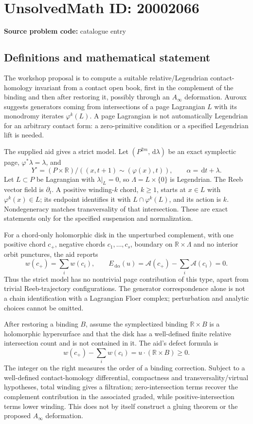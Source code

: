 \documentclass[11pt]{article}
\newcommand{\R}{\mathbb{R}}
\newcommand{\dd}{\,\mathrm{d}}
\begin{document}
\section*{UnsolvedMath ID: 20002066}
\textbf{Source problem code:} catalogue entry
\subsection{Definitions and mathematical statement}
The workshop proposal is to compute a suitable relative/Legendrian contact-homology invariant from a contact open book, first in the complement of the binding and then after restoring it, possibly through an \(A_\infty\) deformation. Auroux suggests generators coming from intersections of a page Lagrangian \(L\) with its monodromy iterates \(\varphi^k(L)\). A page Lagrangian is not automatically Legendrian for an arbitrary contact form: a zero-primitive condition or a specified Legendrian lift is needed.

The supplied aid gives a strict model. Let \((P^{2m},\dd\lambda)\) be an exact symplectic page, \(\varphi^*\lambda=\lambda\), and
\[
Y^\circ=(P\times\R)/((x,t+1)\sim(\varphi(x),t)),\qquad\alpha=\dd t+\lambda.
\]
Let \(L\subset P\) be Lagrangian with \(\lambda|_L=0\), so \(\Lambda=L\times\{0\}\) is Legendrian. The Reeb vector field is \(\partial_t\). A positive winding-\(k\) chord, \(k\geq1\), starts at \(x\in L\) with \(\varphi^k(x)\in L\); its endpoint identifies it with \(L\cap\varphi^k(L)\), and its action is \(k\). Nondegeneracy matches transversality of that intersection. These are exact statements only for the specified suspension and normalization.

For a chord-only holomorphic disk in the unperturbed complement, with one positive chord \(c_+\), negative chords \(c_1,\ldots,c_s\), boundary on \(\R\times\Lambda\) and no interior orbit punctures, the aid reports
\[
w(c_+)=\sum_iw(c_i),\qquad
E_{\dd\alpha}(u)=\mathcal A(c_+)-\sum_i\mathcal A(c_i)=0.
\]
Thus the strict model has no nontrivial page contribution of this type, apart from trivial Reeb-trajectory configurations. The generator correspondence alone is not a chain identification with a Lagrangian Floer complex; perturbation and analytic choices cannot be omitted.

After restoring a binding \(B\), assume the symplectized binding \(\R\times B\) is a holomorphic hypersurface and that the disk has a well-defined finite relative intersection count and is not contained in it. The aid's defect formula is
\[
w(c_+)-\sum_iw(c_i)=u\cdot(\R\times B)\geq0.
\]
The integer on the right measures the order of a binding correction. Subject to a well-defined contact-homology differential, compactness and transversality/virtual hypotheses, total winding gives a filtration; zero-intersection terms recover the complement contribution in the associated graded, while positive-intersection terms lower winding. This does not by itself construct a gluing theorem or the proposed \(A_\infty\) deformation.
\end{document}
